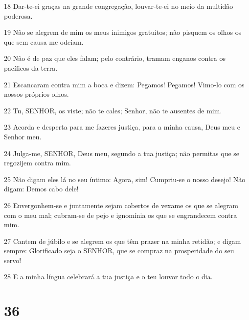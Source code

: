 \par 18 Dar-te-ei graças na grande congregação, louvar-te-ei no meio da multidão poderosa.
\par 19 Não se alegrem de mim os meus inimigos gratuitos; não pisquem os olhos os que sem causa me odeiam.
\par 20 Não é de paz que eles falam; pelo contrário, tramam enganos contra os pacíficos da terra.
\par 21 Escancaram contra mim a boca e dizem: Pegamos! Pegamos! Vimo-lo com os nossos próprios olhos.
\par 22 Tu, SENHOR, os viste; não te cales; Senhor, não te ausentes de mim.
\par 23 Acorda e desperta para me fazeres justiça, para a minha causa, Deus meu e Senhor meu.
\par 24 Julga-me, SENHOR, Deus meu, segundo a tua justiça; não permitas que se regozijem contra mim.
\par 25 Não digam eles lá no seu íntimo: Agora, sim! Cumpriu-se o nosso desejo! Não digam: Demos cabo dele!
\par 26 Envergonhem-se e juntamente sejam cobertos de vexame os que se alegram com o meu mal; cubram-se de pejo e ignomínia os que se engrandecem contra mim.
\par 27 Cantem de júbilo e se alegrem os que têm prazer na minha retidão; e digam sempre: Glorificado seja o SENHOR, que se compraz na prosperidade do seu servo!
\par 28 E a minha língua celebrará a tua justiça e o teu louvor todo o dia.

\chapter{36}

